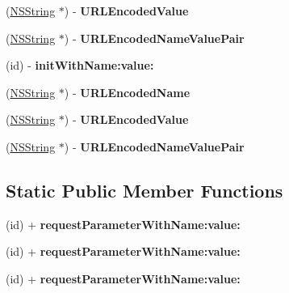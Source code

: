 \begin{DoxyCompactItemize}
\item 
\hypertarget{interface_o_a_request_parameter_ac6364dc825daaa9927a61baf38007678}{
(\hyperlink{class_n_s_string}{\-N\-S\-String} $\ast$) -\/ {\bfseries \-U\-R\-L\-Encoded\-Value}}
\label{interface_o_a_request_parameter_ac6364dc825daaa9927a61baf38007678}

\item 
\hypertarget{interface_o_a_request_parameter_af355e0ae6b5d3b3c4d098754d350e29f}{
(\hyperlink{class_n_s_string}{\-N\-S\-String} $\ast$) -\/ {\bfseries \-U\-R\-L\-Encoded\-Name\-Value\-Pair}}
\label{interface_o_a_request_parameter_af355e0ae6b5d3b3c4d098754d350e29f}

\item 
\hypertarget{interface_o_a_request_parameter_ac4f56cea4909dc4f4e63ce314c34c939}{
(id) -\/ {\bfseries init\-With\-Name\-:value\-:}}
\label{interface_o_a_request_parameter_ac4f56cea4909dc4f4e63ce314c34c939}

\item 
\hypertarget{interface_o_a_request_parameter_af9066b1a1bda750974ca881f933c5883}{
(\hyperlink{class_n_s_string}{\-N\-S\-String} $\ast$) -\/ {\bfseries \-U\-R\-L\-Encoded\-Name}}
\label{interface_o_a_request_parameter_af9066b1a1bda750974ca881f933c5883}

\item 
\hypertarget{interface_o_a_request_parameter_ac6364dc825daaa9927a61baf38007678}{
(\hyperlink{class_n_s_string}{\-N\-S\-String} $\ast$) -\/ {\bfseries \-U\-R\-L\-Encoded\-Value}}
\label{interface_o_a_request_parameter_ac6364dc825daaa9927a61baf38007678}

\item 
\hypertarget{interface_o_a_request_parameter_af355e0ae6b5d3b3c4d098754d350e29f}{
(\hyperlink{class_n_s_string}{\-N\-S\-String} $\ast$) -\/ {\bfseries \-U\-R\-L\-Encoded\-Name\-Value\-Pair}}
\label{interface_o_a_request_parameter_af355e0ae6b5d3b3c4d098754d350e29f}

\end{DoxyCompactItemize}
\subsection*{\-Static \-Public \-Member \-Functions}
\begin{DoxyCompactItemize}
\item 
\hypertarget{interface_o_a_request_parameter_a11ccf1306afe7753588e8b3488496031}{
(id) + {\bfseries request\-Parameter\-With\-Name\-:value\-:}}
\label{interface_o_a_request_parameter_a11ccf1306afe7753588e8b3488496031}

\item 
\hypertarget{interface_o_a_request_parameter_a11ccf1306afe7753588e8b3488496031}{
(id) + {\bfseries request\-Parameter\-With\-Name\-:value\-:}}
\label{interface_o_a_request_parameter_a11ccf1306afe7753588e8b3488496031}

\item 
\hypertarget{interface_o_a_request_parameter_a11ccf1306afe7753588e8b3488496031}{
(id) + {\bfseries request\-Parameter\-With\-Name\-:value\-:}}
\label{interface_o_a_request_parameter_a11ccf1306afe7753588e8b3488496031}

\end{DoxyCompactItemize}
